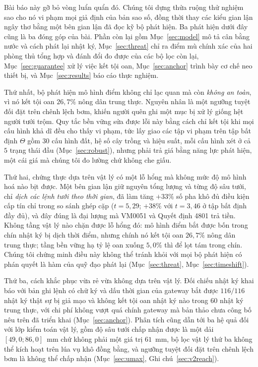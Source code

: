 Bài báo này gỡ bỏ vòng luẩn quẩn đó. Chúng tôi dựng thửa ruộng thử nghiệm sao cho nó vi
phạm mọi giả định của bản sao số, đồng thời thay các kiểu gian lận ngây thơ bằng một bên gian lận đã đọc kỹ bộ phát hiện. Ba phát hiện dưới đây cũng là ba đóng góp của bài. Phần còn
lại gồm Mục~\ref{sec:model} mô tả cân bằng nước và cách phát lại nhật ký,
Mục~\ref{sec:threat} chỉ ra điểm mù chính xác của hai phòng thủ tổng hợp và đánh đổi đo được của các bộ lọc còn lại,
Mục~\ref{sec:guarantee} xử lý việc kết tội oan, Mục~\ref{sec:anchor} trình bày cơ chế neo
thiết bị, và Mục~\ref{sec:results} báo cáo thực nghiệm.

Thứ nhất, bộ phát hiện mô hình điểm không chỉ lạc quan mà còn \emph{không an toàn}, vì nó
kết tội oan $26{,}7\%$ nông dân trung thực. Nguyên nhân là một ngưỡng tuyệt đối đặt trên
chênh lệch bơm, khiến người quên ghi một mục bị xử lý giống hệt người tưới trộm. Quy tắc
bền vững sửa được lỗi này bằng cách chỉ kết tội khi mọi cấu hình khả dĩ đều cho thấy vi
phạm, tức lấy giao các tập vi phạm trên tập bất định $\Theta$ gồm $30$ cấu hình đất, hệ số
cây trồng và hiệu suất, mỗi cấu hình xét ở cả $5$ trạng thái đầu (Mục~\ref{sec:robust}),
nhưng phải trả giá bằng năng lực phát hiện, một cái giá mà chúng tôi đo lường chứ không
che giấu.

Thứ hai, chứng thực dựa trên vật lý có một lỗ hổng mà không mức độ mô hình hoá nào bịt
được. Một bên gian lận giữ nguyên tổng lượng và từng độ sâu tưới, chỉ \emph{dịch các lệnh tưới
theo thời gian}, đã làm tăng $+33\%$ số pha khô đủ điều kiện cấp tín chỉ trong so sánh
ghép cặp ($t=5{,}29$; $+38\%$ với $t=3{,}46$ ở tập bất định đầy đủ), và đây đúng là đại
lượng mà VM0051 và Quyết định 4801 trả tiền. Không tầng vật lý nào chặn được lỗ hổng
đó: mô hình điểm bắt được bốn trong chín nhật ký bị dịch thời điểm, nhưng chính nó kết
tội oan $26{,}7\%$ nông dân trung thực; tầng bền vững hạ tỷ lệ oan xuống $5{,}0\%$ thì để
lọt tám trong chín. Chúng tôi chứng minh điều này không thể tránh khỏi với mọi bộ phát
hiện có phán quyết là hàm của quỹ đạo phát lại (Mục~\ref{sec:threat},
Mục~\ref{sec:timeshift}).

Thứ ba, cách khắc phục vừa rẻ vừa không dựa trên vật lý. Đối chiếu nhật ký khai báo với
bản ghi lệnh có chữ ký và dấu thời gian của gateway bắt được $116/116$ nhật ký thật sự bị
giả mạo và không kết tội oan nhật ký nào trong $60$ nhật ký trung thực, với chi phí không vượt quá chính gateway mà bản thảo chưa công bố nêu trên đã triển khai
(Mục~\ref{sec:anchor}). Phân tích cũng dẫn tới ba hệ quả đối với lớp kiểm toán vật lý, gồm
độ sâu tưới chấp nhận được là một dải $[49{,}0; 86{,}0]$~mm chứ không phải một giá trị $61$~mm,
bộ lọc vật lý thứ ba không thể kích hoạt trên lúa vụ khô đồng bằng, và ngưỡng tuyệt đối
đặt trên chênh lệch bơm là không thể chấp nhận (Mục~\ref{sec:umax},
Ghi chú~\ref{sec:v2reach}).